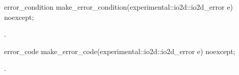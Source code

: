 \begin{itemdecl}
error_condition make_error_condition(experimental::io2d::io2d_error e) noexcept;
\end{itemdecl}
\begin{itemdescr}
\pnum
\returns
{}.
\end{itemdescr}

\begin{itemdecl}
error_code make_error_code(experimental::io2d::io2d_error e) noexcept;
\end{itemdecl}
\begin{itemdescr}
\pnum
\returns
{}.
\end{itemdescr}
